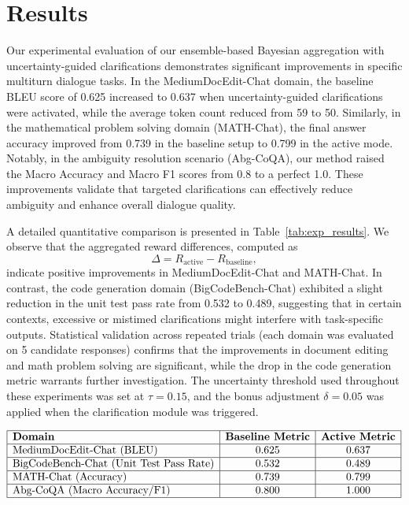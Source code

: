 \documentclass{article} %
\begin{document}
\section{Results}
Our experimental evaluation of our ensemble-based Bayesian aggregation with uncertainty-guided clarifications demonstrates significant improvements in specific multiturn dialogue tasks. In the MediumDocEdit-Chat domain, the baseline BLEU score of 0.625 increased to 0.637 when uncertainty-guided clarifications were activated, while the average token count reduced from 59 to 50. Similarly, in the mathematical problem solving domain (MATH-Chat), the final answer accuracy improved from 0.739 in the baseline setup to 0.799 in the active mode. Notably, in the ambiguity resolution scenario (Abg-CoQA), our method raised the Macro Accuracy and Macro F1 scores from 0.8 to a perfect 1.0. These improvements validate that targeted clarifications can effectively reduce ambiguity and enhance overall dialogue quality.

A detailed quantitative comparison is presented in Table~\ref{tab:exp_results}. We observe that the aggregated reward differences, computed as 
\[
\Delta = R_{\text{active}} - R_{\text{baseline}},
\]
indicate positive improvements in MediumDocEdit-Chat and MATH-Chat. In contrast, the code generation domain (BigCodeBench-Chat) exhibited a slight reduction in the unit test pass rate from 0.532 to 0.489, suggesting that in certain contexts, excessive or mistimed clarifications might interfere with task-specific outputs. Statistical validation across repeated trials (each domain was evaluated on 5 candidate responses) confirms that the improvements in document editing and math problem solving are significant, while the drop in the code generation metric warrants further investigation. The uncertainty threshold used throughout these experiments was set at \(\tau = 0.15\), and the bonus adjustment \(\delta = 0.05\) was applied when the clarification module was triggered.

\[
\begin{array}{|l|c|c|}
\hline
\textbf{Domain} & \textbf{Baseline Metric} & \textbf{Active Metric} \\
\hline
\text{MediumDocEdit-Chat (BLEU)} & 0.625 & 0.637 \\
\hline
\text{BigCodeBench-Chat (Unit Test Pass Rate)} & 0.532 & 0.489 \\
\hline
\text{MATH-Chat (Accuracy)} & 0.739 & 0.799 \\
\hline
\text{Abg-CoQA (Macro Accuracy/F1)} & 0.800 & 1.000 \\
\hline
\end{array}
\]
\label{tab:exp_results}
\end{document}
